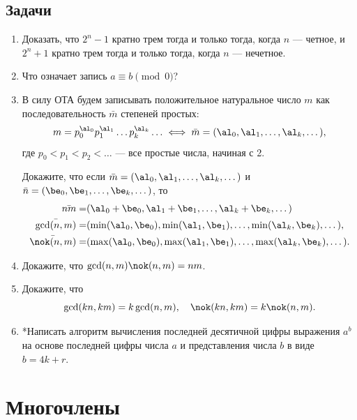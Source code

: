 \subsection*{Задачи}

\begin{enumerate}
\item Доказать, что $2^n-1$ кратно трем тогда и только тогда, когда $n$ --- четное, и $2^n+1$ кратно трем тогда и только тогда, когда $n$ --- нечетное.
\item Что означает запись $a\equiv b\pmod 0$?
\item В силу ОТА будем записывать положительное натуральное число $m$ как последовательность $\bar m$ степеней простых:
$$
m=p_0^{\al_0}p_1^{\al_1}\dots p_k^{\al_k}\ldots\iff \bar m=(\al_0,\al_1,\dots,\al_k,\dots),
$$
где $p_0<p_1<p_2<\dots$ --- все простые числа, начиная с 2.

Докажите, что если $\bar m=(\al_0,\al_1,\dots,\al_k,\dots)$ и $\bar n=(\be_0,\be_1,\dots,\be_k,\dots)$, то
\begin{align*}
\bar{nm} = & (\al_0+\be_0,\al_1+\be_1,\dots,\al_k+\be_k,\dots) \\
\bar{\gcd(n,m)} = & (\min(\al_0,\be_0),\min(\al_1,\be_1),\dots,\min(\al_k,\be_k),\dots), \\
\bar{\nok(n,m)} = & (\max(\al_0,\be_0),\max(\al_1,\be_1),\dots,\max(\al_k,\be_k),\dots).
\end{align*}

\item Докажите, что $\gcd(n,m)\nok(n,m)=nm$.
\item Докажите, что
$$
\gcd(kn,km)=k\gcd(n,m),\quad \nok(kn,km)=k\nok(n,m).
$$
\item *Написать алгоритм вычисления последней десятичной цифры выражения $a^b$ на основе последней цифры числа $a$ и представления числа $b$ в виде $b=4k+r$.
\end{enumerate}



\section{Многочлены}




